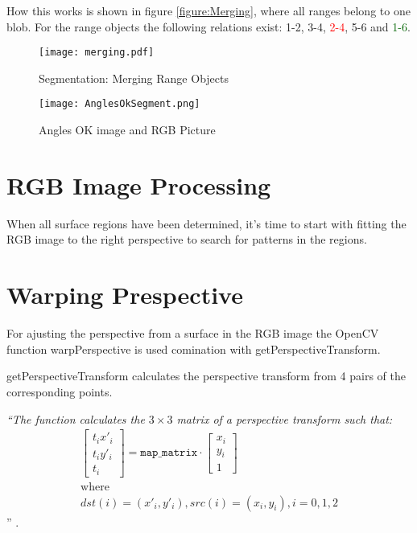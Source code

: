 How this works is shown in figure \vref{figure:Merging}, where all ranges belong to one blob. For the range objects
the following relations exist: 1-2, 3-4, \textcolor{red}{2-4}, 5-6 and \textcolor{darkgreen}{1-6}.

\begin{figure}[H]
\begin{center}
  \texttt{[image: merging.pdf]}
  \caption{Segmentation: Merging Range Objects}
  \label{figure:Merging}
\end{center}
\end{figure}
 



\begin{figure}[H]
\begin{center}
  \texttt{[image: AnglesOkSegment.png]}
  \caption[Angles OK Image and RGB Picture]{Angles OK image and RGB Picture\footnotemark}
  \label{figure:AnglesOKSeg}
\end{center}
\end{figure}
\newpage

\section{RGB Image Processing}

When all surface regions have been determined, it's time to start with fitting the RGB image 
to the right perspective to search for patterns in the regions. 


\section{Warping Prespective}
For ajusting the perspective from a surface in the RGB image the OpenCV function warpPerspective
 is used comination with getPerspectiveTransform.

getPerspectiveTransform calculates the perspective transform from 4 pairs of the corresponding points.

\textit{
``The function calculates the $3 \times 3$ matrix of a perspective transform such that:
\begin{gather}
\begin{bmatrix} t_i x'_i \\ t_i y'_i \\ t_i \end{bmatrix} = \texttt{map\_matrix} \cdot \begin{bmatrix} x_i \\ y_i \\ 1 \end{bmatrix} 
\nonumber\\\mbox{where}\nonumber\\dst(i)=(x'_i,y'_i), src(i)=(x_i, y_i), i=0,1,2 
\end{gather}
}''
\cite{willowgarage:opencv:getPerspectiveTransform}.

